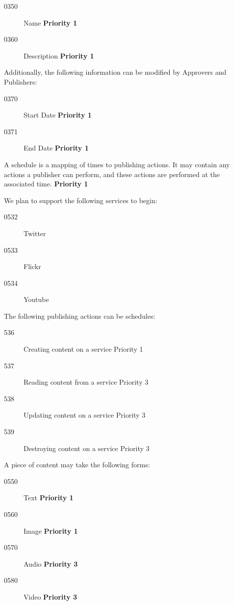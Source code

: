 \documentclass{article}
\begin{document}
\begin{description}
\begin{description}
  \begin{description}
  \item[0350]Name \textbf{Priority 1}
  \item[0360]Description \textbf{Priority 1}
  \end{description}

\item Additionally, the following information can be modified by Approvers
  and Publishers:
  \begin{description}
  \item[0370]Start Date \textbf{Priority 1}
  \item[0371]End Date \textbf{Priority 1}
  \end{description}

\item[0530] A schedule is a mapping of times to publishing actions. It may
  contain any actions a publisher can perform, and these actions are
  performed at the associated time. \textbf{Priority 1}

\item[0531] We plan to support the following services to begin:
  \begin{description}
  \item[0532] Twitter
  \item[0533] Flickr
  \item[0534] Youtube
  \end{description}     

\item[0535] The following publishing actions can be schedules:
  \begin{description}
  \item[536] Creating content on a service {Priority 1}
  \item[537] Reading content from a service {Priority 3}
  \item[538] Updating content on a service {Priority 3}
  \item[539] Destroying content on a service {Priority 3}
  \end{description}

\item[0540] A piece of content may take the following forms:
\begin{description}
\item[0550] Text \textbf{Priority 1}
\item[0560] Image \textbf{Priority 1}
\item[0570] Audio \textbf{Priority 3}
\item[0580] Video \textbf{Priority 3}
\end{description}
\end{description}


\end{description}
\end{document}
